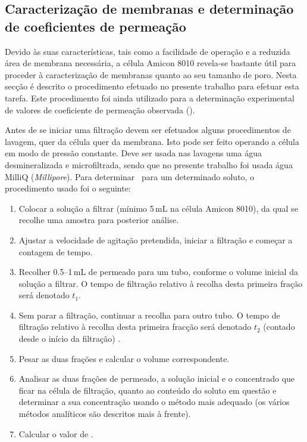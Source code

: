 \subsection{Caracterização de membranas e determinação de coeficientes de permeação} %
\label{sub:car_mem}
%
Devido às suas características, tais como a facilidade de operação e a reduzida área de membrana necessária, a célula Amicon 8010 revela-se bastante útil para proceder à caracterização de membranas quanto ao seu tamanho de poro. Nesta secção é descrito o procedimento efetuado no presente trabalho para efetuar esta tarefa. Este procedimento foi ainda utilizado para a determinação experimental de valores de coeficiente de permeação observada (\permobs).

Antes de se iniciar uma filtração devem ser efetuados alguns procedimentos de lavagem, quer da célula quer da membrana. Isto pode ser feito operando a célula em modo de pressão constante. Deve ser usada nas lavagens uma água desmineralizada e microfiltrada, sendo que no presente trabalho foi usada água MilliQ (\emph{Millipore}). Para determinar \permobs\ para um determinado soluto, o procedimento usado foi o seguinte:
\begin{enumerate}
	\item Colocar a solução a filtrar (mínimo 5\,mL na célula Amicon 8010), da qual se recolhe uma amostra para posterior análise. 
	\item Ajustar a velocidade de agitação pretendida, iniciar a filtração e começar a contagem de tempo.
	\item Recolher 0.5--1\,mL de permeado para um tubo, conforme o volume inicial da solução a filtrar. O tempo de filtração relativo à recolha desta primeira fração será denotado $t_1$.
	\item Sem parar a filtração, continuar a recolha para outro tubo. O tempo de filtração relativo à recolha desta primeira fracção será denotado $t_2$ (contado desde o início da filtração) .
	\item Pesar as duas frações e calcular o volume correspondente.
	\item Analisar as duas frações de permeado, a solução inicial e o concentrado que ficar na célula de filtração, quanto ao conteúdo do soluto em questão e determinar a sua concentração usando o método mais adequado (os vários métodos analíticos são descritos mais à frente).
	\item Calcular o valor de \permobs. 
\end{enumerate}

